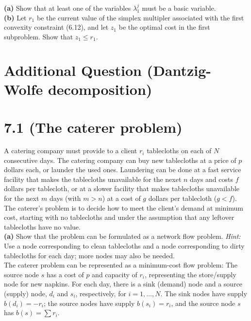 \documentclass{article}
\begin{document}
\noindent
\textbf{(a)} Show that at least one of the variables $\lambda_1^j$ must be a basic variable. \\

\noindent
\textbf{(b)}  Let $r_1$ be the current value of the simplex multipler associated with the first convexity constraint (6.12), and let $z_1$ be the optimal cost in the first subproblem.  Show that $z_1 \leq r_1$.  

\section*{Additional Question (Dantzig-Wolfe decomposition)}




\section*{7.1 (The caterer problem)}
A catering company must provide to a client $r_i$ tablecloths on each of $N$ consecutive days.  The catering company can buy new tablecloths at a price of $p$ dollars each, or launder the used ones.  Laundering can be done at a fast service facility that makes the tablecloths unavailable for the nexet $n$ days and costs $f$ dollars per tablecloth, or at a slower facility that makes tablecloths unavailable for the next $m$ days (with $m > n$) at a cost of $g$ dollars per tablecloth ($g < f$).  The caterer's problem is to decide how to meet the  client's demand at minimum cost, starting with no tablecloths and under the assumption that any leftover tablecloths have no value. \\

\noindent \textbf{(a)}
Show that the problem can be formulated as a network flow problem.  \emph{Hint:}  Use a node corresponding to clean tablecloths and a node corresponding to dirty tablecloths for each day; more nodes may also be needed. \\

The caterer problem can be represented as a minimum-cost flow problem:  The source node $s$ has a cost of $p$ and capacity of $r_i$, representing the store/supply node for new napkins.  For each day, there is a sink (demand) node and a source (supply) node, $d_i$ and $s_i$, respectively, for $i = 1, \ldots, N$.   The sink nodes have supply $b(d_i) = -r_i$; the source nodes have supply $b(s_i) = r_i$, and the source node $s$ has $b(s) = \sum r_i$.\\
  
\end{document}
